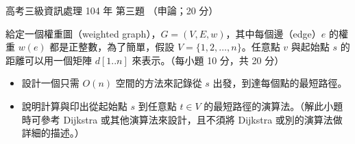 \begin{pastexam}[label={px:gk3-104-ds-03}]{高考三級資訊處理 104 年 第三題}
（申論；20 分）

給定一個權重圖（weighted graph），$G=(V,E,w)$，其中每個邊（edge）$e$ 的權重 $w(e)$ 都是正整數，為了簡單，假設 $V=\{1,2,\ldots,n\}$。任意點 $v$ 與起始點 $s$ 的距離可以用一個矩陣 $d[1..n]$ 來表示。（每小題 10 分，共 20 分）
\begin{itemize}[leftmargin=2.2em]
\item[㈠] 設計一個只需 $O(n)$ 空間的方法來記錄從 $s$ 出發，到達每個點的最短路徑。
\item[㈡] 說明計算與印出從起始點 $s$ 到任意點 $t\in V$ 的最短路徑的演算法。（解此小題時可參考 Dijkstra 或其他演算法來設計，且不須將 Dijkstra 或別的演算法做詳細的描述。）
\end{itemize}
\end{pastexam}


